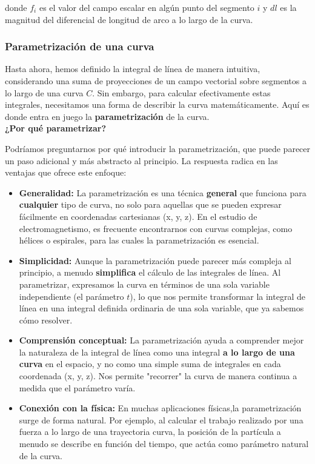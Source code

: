 \documentclass{article}
\begin{document}
donde $f_i$ es el valor del campo escalar en algún punto del segmento $i$ y $dl$ es la magnitud del diferencial de longitud de arco a lo largo de la curva.

\subsubsection{Parametrización de una curva}

Hasta ahora, hemos definido la integral de línea de manera intuitiva, considerando una suma de proyecciones de un campo vectorial sobre segmentos a lo largo de una curva $C$. Sin embargo, para calcular efectivamente estas integrales, necesitamos una forma de describir la curva matemáticamente. Aquí es donde entra en juego la \textbf{parametrización} de la curva.\\

\textbf{¿Por qué parametrizar?}

Podríamos preguntarnos por qué introducir la parametrización, que puede parecer un paso adicional y más abstracto al principio. La respuesta radica en las ventajas que ofrece este enfoque:

\begin{itemize}
    \item \textbf{Generalidad:} La parametrización es una técnica \textbf{general} que funciona para \textbf{cualquier} tipo de curva, no solo para aquellas que se pueden expresar fácilmente en coordenadas cartesianas (x, y, z). En el estudio de electromagnetismo, es frecuente encontrarnos con curvas complejas, como hélices o espirales, para las cuales la parametrización es esencial.
    \item \textbf{Simplicidad:} Aunque la parametrización puede parecer más compleja al principio, a menudo \textbf{simplifica} el cálculo de las integrales de línea. Al parametrizar, expresamos la curva en términos de una sola variable independiente (el parámetro $t$), lo que nos permite transformar la integral de línea en una integral definida ordinaria de una sola variable, que ya sabemos cómo resolver.
    \item \textbf{Comprensión conceptual:} La parametrización ayuda a comprender mejor la naturaleza de la integral de línea como una integral \textbf{a lo largo de una curva} en el espacio, y no como una simple suma de integrales en cada coordenada (x, y, z). Nos permite "recorrer" la curva de manera continua a medida que el parámetro varía.
    \item \textbf{Conexión con la física:} En muchas aplicaciones físicas,la parametrización surge de forma natural. Por ejemplo, al calcular el trabajo realizado por una fuerza a lo largo de una trayectoria curva, la posición de la partícula a menudo se describe en función del tiempo, que actúa como parámetro natural de la curva.
\end{itemize}
\end{document}
